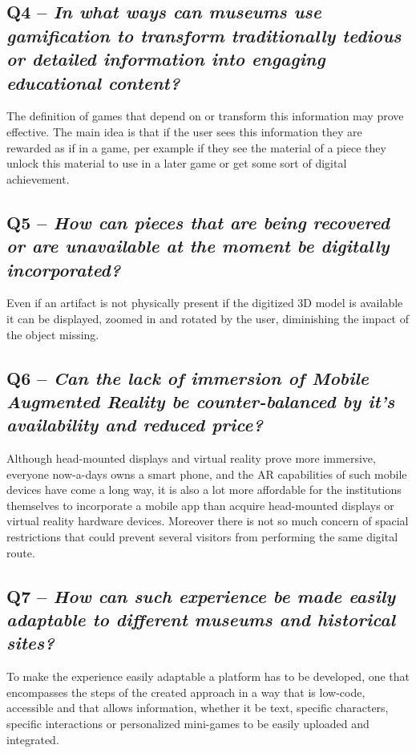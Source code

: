 \subsection*{\textbf{Q4} -- \textit{ In what ways can museums use gamification to transform traditionally tedious or detailed information into engaging educational content?}}

The definition of games that depend on or transform this information may prove effective. The main idea is that if the user sees this information they are rewarded
as if in a game, per example if they see the material of a piece they unlock this material to use in a later game or get some sort of digital achievement.

\subsection*{\textbf{Q5} -- \textit{ How can pieces that are being recovered or are unavailable at the moment be digitally incorporated?}}

Even if an artifact is not physically present if the digitized 3D model is available it can be displayed, zoomed in and rotated by the user, diminishing
the impact of the object missing.

\subsection*{\textbf{Q6} -- \textit{ Can the lack of immersion of Mobile Augmented Reality be counter-balanced by it's availability and reduced price?}}

Although head-mounted displays and virtual reality prove more immersive, everyone now-a-days owns a smart phone, and the AR capabilities of such mobile devices
have come a long way, it is also a lot more affordable for the institutions themselves to incorporate a mobile app than acquire head-mounted displays or 
virtual reality hardware devices. Moreover there is not so much concern of spacial restrictions that could prevent several visitors from
performing the same digital route.

\subsection*{\textbf{Q7} -- \textit{ How can such experience be made easily adaptable to different museums and historical sites?}}

To make the experience easily adaptable a platform has to be developed, one that encompasses the steps of the created approach in a way that is low-code,
accessible and that allows information, whether it be text, specific characters, specific interactions or personalized mini-games to be easily uploaded
and  integrated.\\


